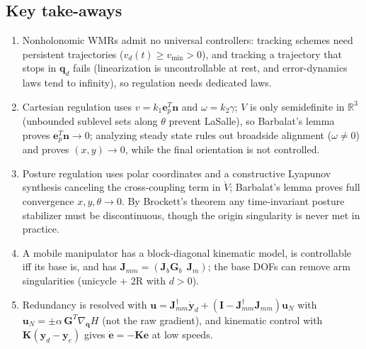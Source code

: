 \documentclass[11pt,a4paper]{article}
\newcommand{\Gbase}{\bm{G}_b}
\newcommand{\Jbase}{\bm{J}_b}
\newcommand{\Jarm}{\bm{J}_m}
\newcommand{\Jmm}{\bm{J}_{mm}}
\newcommand{\ye}{\bm{y}_e}
\newcommand{\R}{\mathbb{R}}
\newcommand{\grad}{\nabla_{\!\bm{q}}}
\theoremstyle{plain}
\theoremstyle{definition}
\theoremstyle{remark}
\begin{document}
\subsection*{Key take-aways}
\begin{enumerate}[leftmargin=*]
\item Nonholonomic WMRs admit no universal controllers: tracking schemes need persistent trajectories ($v_d(t)\ge v_{\min}>0$), and tracking a trajectory that stops in $\bm q_d$ fails (linearization is uncontrollable at rest, and error-dynamics laws tend to infinity), so regulation needs dedicated laws.
\item Cartesian regulation uses $v=k_1\bm e_p^T\bm n$ and $\omega=k_2\gamma$; $V$ is only semidefinite in $\R^3$ (unbounded sublevel sets along $\theta$ prevent LaSalle), so Barbalat's lemma proves $\bm e_p^T\bm n\to0$; analyzing steady state rules out broadside alignment ($\omega\ne0$) and proves $(x,y)\to0$, while the final orientation is not controlled.
\item Posture regulation uses polar coordinates and a constructive Lyapunov synthesis canceling the cross-coupling term in $\dot V$; Barbalat's lemma proves full convergence $x,y,\theta\to0$. By Brockett's theorem any time-invariant posture stabilizer must be discontinuous, though the origin singularity is never met in practice.
\item A mobile manipulator has a block-diagonal kinematic model, is controllable iff its base is, and has $\Jmm=(\Jbase\Gbase\ \ \Jarm)$; the base DOFs can remove arm singularities (unicycle + 2R with $d>0$).
\item Redundancy is resolved with $\bm u=\Jmm^\dagger\dot{\bm y}_d+(\bm I-\Jmm^\dagger\Jmm)\bm u_N$ with $\bm u_N=\pm\alpha\,\bm G^T\grad H$ (not the raw gradient), and kinematic control with $\bm K(\bm y_d-\ye)$ gives $\dot{\bm e}=-\bm K\bm e$ at low speeds.
\end{enumerate}
\end{document}
